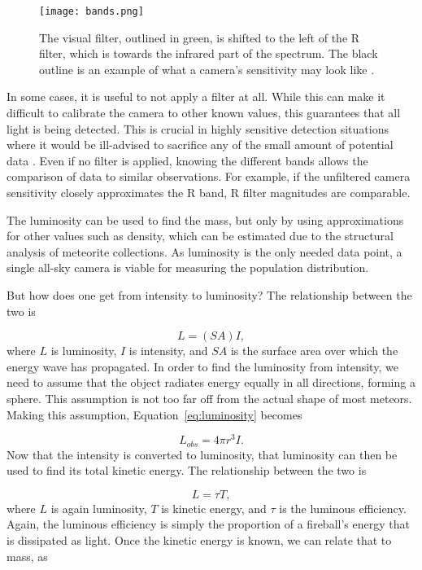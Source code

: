\begin{figure}[ht!]
	\centering
	\texttt{[image: bands.png]}
	\caption{The visual filter, outlined in green, is shifted to the left of the R filter, which is towards the infrared part of the spectrum. The black outline is an example of what a camera's sensitivity may look like \protect\cite{Suggs2017}.}
	\label{fig:bands}
\end{figure}

In some cases, it is useful to not apply a filter at all. While this can make it difficult to calibrate the camera to other known values, this guarantees that all light is being detected. This is crucial in highly sensitive detection situations where it would be ill-advised to sacrifice any of the small amount of potential data \cite{Rembold2015}. Even if no filter is applied, knowing the different bands allows the comparison of data to similar observations. For example, if the unfiltered camera sensitivity closely approximates the R band, R filter magnitudes are comparable.

The luminosity can be used to find the mass, but only by using approximations for other values such as density, which can be estimated due to the structural analysis of meteorite collections. As luminosity is the only needed data point, a single all-sky camera is viable for measuring the population distribution.

But how does one get from intensity to luminosity? The relationship between the two is

\begin{equation}
	L = (SA)I,
	\label{eq:luminosity}
\end{equation}
where $L$ is luminosity, $I$ is intensity, and $SA$ is the surface area over which the energy wave has propagated. In order to find the luminosity from intensity, we need to assume that the object radiates energy equally in all directions, forming a sphere. This assumption is not too far off from the actual shape of most meteors. Making this assumption, Equation~\ref{eq:luminosity} becomes 

\begin{equation}
	L_{obs} = 4 \pi r^3 I.
\end{equation}
Now that the intensity is converted to luminosity, that luminosity can then be used to find its total kinetic energy. The relationship between the two is

\begin{equation}
	L = \tau T,
	\label{eq:kinetic}
\end{equation}
where $L$ is again luminosity, $T$ is kinetic energy, and $\tau$ is the luminous efficiency. Again, the luminous efficiency is simply the proportion of a fireball's energy that is dissipated as light. Once the kinetic energy is known, we can relate that to mass, as

